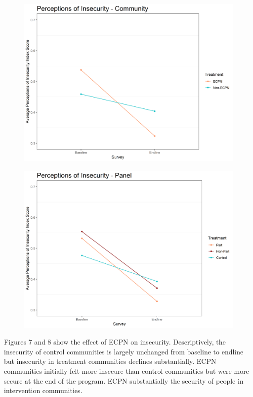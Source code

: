 \documentclass[]{article}
\begin{document}
\begin{figure}[!h]
    \begin{minipage}[b]{.48\textwidth}
        \includegraphics[width=\linewidth]{../figs/inComm_plot.png}
        \label{fig:fig7}
    \end{minipage}
    \hfill
    \begin{minipage}[b]{.48\textwidth}
        \includegraphics[width=\linewidth]{../figs/inPan_plot.png}
        \label{fig:fig8}
    \end{minipage}
\end{figure}

Figures 7 and 8 show the effect of ECPN on insecurity. Descriptively,
the insecurity of control communities is largely unchanged from baseline
to endline but insecurity in treatment communities declines
substantially. ECPN communities initially felt more insecure than
control communities but were more secure at the end of the program. ECPN
substantially the security of people in intervention communities.
\end{document}
